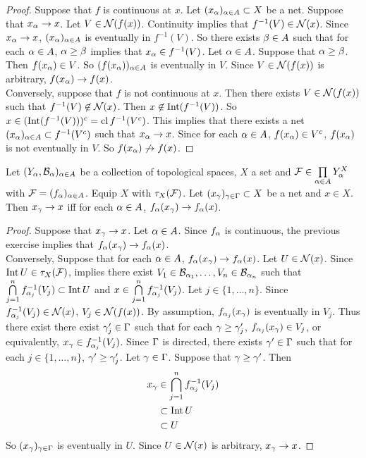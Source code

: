 \documentclass{book}
\begin{document}
	\begin{proof}
	Suppose that $f$ is continuous at $x$. Let $(x_{\alpha})_{\alpha \in A} \subset X$ be a net. Suppose that $x_{\alpha} \rightarrow x$. Let $V \in \mathcal{N}(f(x))$. Continuity implies that $f^{-1}(V) \in \mathcal{N}(x)$. Since  $x_{\alpha} \rightarrow x$, $(x_{\alpha})_{\alpha \in A}$ is eventually in $f^{-1}(V)$. So there exists $\beta \in A$ such that for each $\alpha \in A$, $\alpha \geq \beta$ implies that $x_{\alpha} \in f^{-1}(V)$. Let $\alpha \in A$. Suppose that $\alpha \geq \beta$. Then $f(x_{\alpha}) \in V$. So $(f(x_{\alpha}))_{\alpha \in A}$ is eventually in $V$. Since $V \in \mathcal{N}(f(x))$ is arbitrary, $f(x_{\alpha}) \rightarrow f(x)$.\\
	Conversely, suppose that $f$ is not continuous at $x$. Then there exists $V \in \mathcal{N}(f(x))$ such that $f^{-1}(V) \not \in \mathcal{N}(x)$. Then $x \not \in \operatorname{Int} (f^{-1}(V))$. So $x \in (\operatorname{Int} (f^{-1}(V)))^c = \operatorname{cl} f^{-1}(V^c)$. This implies that there exists a net $(x_{\alpha})_{\alpha \in A} \subset f^{-1}(V^c)$ such that $x_{\alpha} \rightarrow x$. Since for each $\alpha \in A$, $f(x_{\alpha}) \in V^c$, $f(x_{\alpha})$ is not eventually in $V$. So $f(x_{\alpha}) \not \rightarrow f(x)$. 
\end{proof}		
	
	\begin{ex} 
	Let $(Y_{\alpha}, \mathcal{B}_{\alpha})_{\alpha \in A}$ be a collection of topological spaces, $X$ a set and $\mathcal{F} \in \prod \limits_{\alpha \in A}Y_{\alpha}^X$ with $\mathcal{F} = (f_{\alpha})_{\alpha \in A}$. Equip $X$ with $\tau_X(\mathcal{F})$. Let $(x_{\gamma})_{\gamma \in \Gamma} \subset X$ be a net and $x \in X$. Then $x_{\gamma} \rightarrow x$ iff for each $\alpha \in A$, $f_{\alpha}(x_{\gamma}) \rightarrow f_{\alpha}(x)$.  
	\end{ex}
	
	\begin{proof}
	Suppose that $x_{\gamma} \rightarrow x$. Let $\alpha \in A$. Since $f_{\alpha}$ is continuous, the previous exercise implies that $f_{\alpha}(x_{\gamma}) \rightarrow f_{\alpha}(x)$. \\
	Conversely, Suppose that for each $\alpha \in A$,  $f_{\alpha}(x_{\gamma}) \rightarrow f_{\alpha}(x)$. Let $U \in \mathcal{N}(x)$. Since $\operatorname{Int} U \in \tau_X(\mathcal{F})$,  implies there exist $V_1 \in \mathcal{B}_{\alpha_1}, \ldots, V_n \in \mathcal{B}_{\alpha_n}$ such that $\bigcap\limits_{j=1}^n f_{\alpha_j}^{-1}(V_j) \subset \operatorname{Int} U$ and $x \in \bigcap\limits_{j=1}^n f_{\alpha_j}^{-1}(V_j)$. Let $j \in \{1, \ldots, n\}$. Since $f_{\alpha_j}^{-1}(V_j) \in \mathcal{N}(x)$, $V_j \in \mathcal{N}(f(x))$. By assumption, $f_{\alpha_j}(x_{\gamma})$ is eventually in $V_j$. Thus there exist there exist $\gamma'_j \in \Gamma$ such that for each $\gamma \geq \gamma'_j$, $f_{\alpha_j}(x_{\gamma}) \in V_j$, or equivalently, $x_{\gamma} \in f_{\alpha_j}^{-1}(V_j)$. Since $\Gamma$ is directed, there exists $\gamma' \in \Gamma$ such that for each $j \in \{1, \ldots, n\}$, $\gamma' \geq \gamma'_j$. Let $\gamma \in \Gamma$. Suppose that $\gamma \geq \gamma'$. Then 
	\begin{align*}
	x_{\gamma} 
	& \in \bigcap\limits_{j=1}^n f_{\alpha_j}^{-1}(V_j) \\
	& \subset \operatorname{Int} U \\
	& \subset U
\end{align*}	
	So $(x_\gamma)_{\gamma \in \Gamma}$ is eventually in $U$. Since $U \in \mathcal{N}(x)$ is arbitrary, $x_{\gamma} \rightarrow x$.  
	\end{proof}
	
\end{document}
